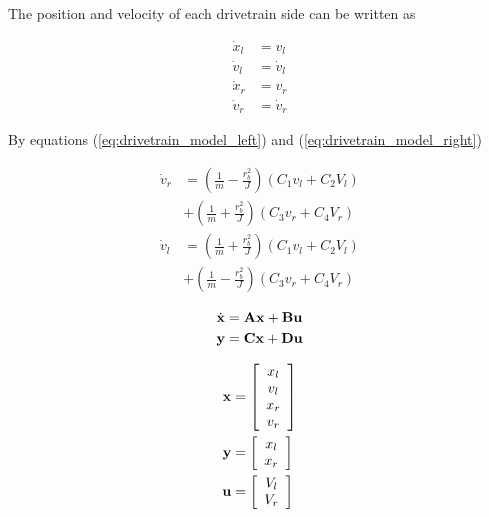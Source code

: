 The position and velocity of each drivetrain side can be written as

\begin{align}
  \dot{x}_l &= v_l \label{eq:drivetrain_cont_ss_posl} \\
  \dot{v}_l &= \dot{v}_l \label{eq:drivetrain_cont_ss_vell} \\
  \dot{x}_r &= v_r \label{eq:drivetrain_cont_ss_posr} \\
  \dot{v}_r &= \dot{v}_r \label{eq:drivetrain_cont_ss_velr}
\end{align}

By equations (\ref{eq:drivetrain_model_left}) and
(\ref{eq:drivetrain_model_right})

\begin{align*}
  \dot{v}_r &= \left(\frac{1}{m} - \frac{r_b^2}{J}\right)
    \left(C_1 v_l + C_2 V_l\right) \nonumber \\
  & + \left(\frac{1}{m} + \frac{r_b^2}{J}\right) \left(C_3 v_r + C_4 V_r\right)
    \\
  \dot{v}_l &= \left(\frac{1}{m} + \frac{r_b^2}{J}\right)
    \left(C_1 v_l + C_2 V_l\right) \nonumber \\
  & + \left(\frac{1}{m} - \frac{r_b^2}{J}\right) \left(C_3 v_r + C_4 V_r\right)
\end{align*}

\begin{align*}
  \dot{\mathbf{x}} &= \mathbf{A} \mathbf{x} + \mathbf{B} \mathbf{u} \\
  \mathbf{y} &= \mathbf{C} \mathbf{x} + \mathbf{D} \mathbf{u}
\end{align*}

\begin{align*}
  \mathbf{x} &= \left[
  \begin{array}{c}
    x_l \\
    v_l \\
    x_r \\
    v_r
  \end{array}
  \right] \\
  \mathbf{y} &= \left[
  \begin{array}{c}
    x_l \\
    x_r
  \end{array}
  \right] \\
  \mathbf{u} &= \left[
  \begin{array}{c}
    V_l \\
    V_r
  \end{array}
  \right]
\end{align*}

